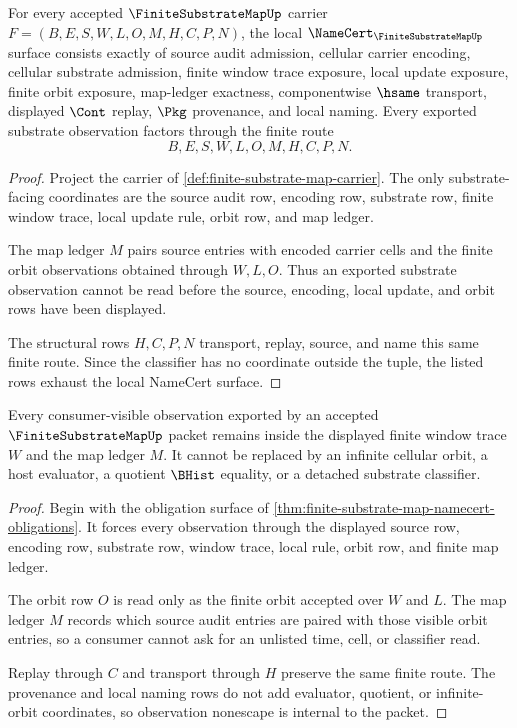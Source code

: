 \begin{theorem}
\label{thm:finite-substrate-map-namecert-obligations}
For every accepted $\FiniteSubstrateMapUp$ carrier
$F=(B,E,S,W,L,O,M,H,C,P,N)$, the local
$\NameCert_{\FiniteSubstrateMapUp}$ surface consists exactly of source audit
admission, cellular carrier encoding, cellular substrate admission, finite
window trace exposure, local update exposure, finite orbit exposure, map-ledger
exactness, componentwise $\hsame$ transport, displayed $\Cont$ replay, $\Pkg$
provenance, and local naming. Every exported substrate observation factors
through the finite route
$$
B,E,S,W,L,O,M,H,C,P,N .
$$
\end{theorem}
\begin{proof}
Project the carrier of \autoref{def:finite-substrate-map-carrier}. The only
substrate-facing coordinates are the source audit row, encoding row, substrate
row, finite window trace, local update rule, orbit row, and map ledger.

The map ledger $M$ pairs source entries with encoded carrier cells and the
finite orbit observations obtained through $W,L,O$. Thus an exported substrate
observation cannot be read before the source, encoding, local update, and orbit
rows have been displayed.

The structural rows $H,C,P,N$ transport, replay, source, and name this same
finite route. Since the classifier has no coordinate outside the tuple, the
listed rows exhaust the local NameCert surface.
\end{proof}

\begin{theorem}
\label{thm:finite-substrate-map-observation-nonescape}
Every consumer-visible observation exported by an accepted
$\FiniteSubstrateMapUp$ packet remains inside the displayed finite window trace
$W$ and the map ledger $M$. It cannot be replaced by an infinite cellular
orbit, a host evaluator, a quotient $\BHist$ equality, or a detached substrate
classifier.
\end{theorem}
\begin{proof}
Begin with the obligation surface of
\autoref{thm:finite-substrate-map-namecert-obligations}. It forces every
observation through the displayed source row, encoding row, substrate row,
window trace, local rule, orbit row, and finite map ledger.

The orbit row $O$ is read only as the finite orbit accepted over $W$ and $L$.
The map ledger $M$ records which source audit entries are paired with those
visible orbit entries, so a consumer cannot ask for an unlisted time, cell, or
classifier read.

Replay through $C$ and transport through $H$ preserve the same finite route.
The provenance and local naming rows do not add evaluator, quotient, or
infinite-orbit coordinates, so observation nonescape is internal to the packet.
\end{proof}


